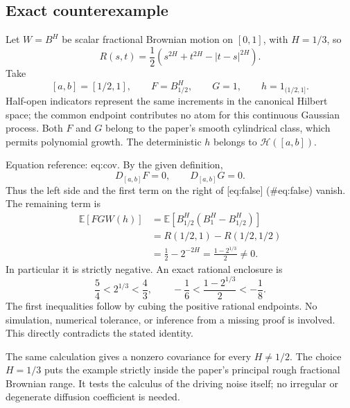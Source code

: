 \documentclass[10pt]{article}
\begin{document}
\subsection*{Exact counterexample}
Let \(W=B^H\) be scalar fractional Brownian motion on \([0,1]\), with \(H=1/3\), so \[R(s,t)=\frac12(s^{2H}+t^{2H}-|t-s|^{2H}).\] Take \[[a,b]=[1/2,1],\qquad F=B^H_{1/2},\qquad G=1,\qquad
 h=1_{(1/2,1]}.\] Half-open indicators represent the same increments in the canonical Hilbert space; the common endpoint contributes no atom for this continuous Gaussian process. Both \(F\) and \(G\) belong to the paper’s smooth cylindrical class, which permits polynomial growth. The deterministic \(h\) belongs to \(\mathcal H([a,b])\).\par
Equation reference: eq:cov. By the given definition, \[D_{[a,b]}F=0,\qquad D_{[a,b]}G=0.\] Thus the left side and the first term on the right of [eq:false] (\#eq:false) vanish. The remaining term is \[\begin{aligned}
 \mathbb E[FGW(h)]
 &=\mathbb E\!\left[B^H_{1/2}(B^H_1-B^H_{1/2})\right]\\
 &=R(1/2,1)-R(1/2,1/2)\\
 &=\frac12-2^{-2H}
   =\frac{1-2^{1/3}}2\ne0. \end{aligned}\] In particular it is strictly negative. An exact rational enclosure is \[\frac54<2^{1/3}<\frac43,\qquad
 -\frac16<\frac{1-2^{1/3}}2<-\frac18.\] The first inequalities follow by cubing the positive rational endpoints. No simulation, numerical tolerance, or inference from a missing proof is involved. This directly contradicts the stated identity.\par
The same calculation gives a nonzero covariance for every \(H\ne1/2\). The choice \(H=1/3\) puts the example strictly inside the paper’s principal rough fractional Brownian range. It tests the calculus of the driving noise itself; no irregular or degenerate diffusion coefficient is needed.\par
\end{document}
